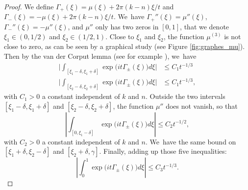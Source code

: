\documentclass[JEP,XML,SOM,Unicode,NoFloatCountersInSection,published]{cedram}
\theoremstyle{definition}
\let\EE\exp
\newcommand{\abs}[1]{\left|#1\right|}
\newcommand{\bbabs}[1]{\biggl|#1\biggr|}
\begin{document}
\begin{proof}
We define $\Gamma_+(\xi) = \mu(\xi) + {2\pi}(k-n)\xi/t$ and $\Gamma_-(\xi) = -\mu(\xi) + {2\pi}(k-n)\xi/t$. We~have $\Gamma_+''(\xi) = \mu''(\xi)$, $\Gamma_-''(\xi) = -\mu''(\xi)$, and $\mu''$ only has two zeros in $[0,1]$, that we denote $\xi_1 \in (0,1/2)$ and $\xi_2\in(1/2,1)$. Close to $\xi_1$ and $\xi_2$, the function $\mu^{(3)}$ is not close to zero, as can be seen by a graphical study (see Figure \ref{fig:graphes_mu}). Then by the van der Corput lemma (see for example \cite{Stein}), we~have
\begin{align*}
\bbabs{ \int_{[\xi_1-\delta, \xi_1+\delta]} \EE\bigl({it\Gamma_\pm(\xi)}\bigr)d\xi } &\leq {C_1}{t^{-1/3}}\\
\tag*{and}
\bbabs{ \int_{[\xi_2-\delta, \xi_2+\delta]} \EE\bigl({it\Gamma_\pm(\xi)}\bigr)d\xi } &\leq {C_1}{t^{-1/3}}, 
\end{align*}
with $C_1 > 0$ a constant independent of $k$ and $n$. Outside the two intervals \hbox{$[\xi_1-\delta, \xi_1+\delta]$} and $[\xi_2-\delta, \xi_2+\delta]$, the function $\mu''$ does not vanish, so that
\[
\abs{ \int_{[0, \xi_1-\delta]} \EE\bigl({it\Gamma_\pm(\xi)}\bigr)d\xi } \leq {C_2}{t^{-1/2}}, 
\]
with $C_2 > 0$ a constant independent of $k$ and $n$. We~have the same bound on \hbox{$[\xi_1+\delta, \xi_2-\delta]$} and $[\xi_2+\delta, \gamma]$. Finally, adding up those five inequalities:
\begin{equation}\label{estimation2}
\abs{ \int_{0}^1 \EE\bigl({it\Gamma_\pm(\xi)}\bigr)d\xi } \leq {C_3}{t^{-1/3}}.
\end{equation}


\end{proof}
\end{document}
